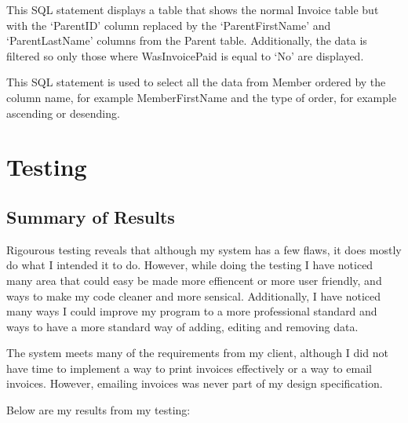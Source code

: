This SQL statement displays a table that shows the normal Invoice table but with the `ParentID' column replaced by the `ParentFirstName' and `ParentLastName' columns from the Parent table. Additionally, the data is filtered so only those where WasInvoicePaid is equal to `No' are displayed.


This SQL statement is used to select all the data from Member ordered by the column name, for example MemberFirstName and the type of order, for example ascending or desending.

\section{Testing}

\subsection{Summary of Results}
Rigourous testing reveals that although my system has a few flaws, it does mostly do what I intended it to do. However, while doing the testing I have noticed many area that could easy be made more effiencent or more user friendly, and ways to make my code cleaner and more sensical. Additionally, I have noticed many ways I could improve my program to a more professional standard and ways to have a more standard way of adding, editing and removing data.

The system meets many of the requirements from my client, although I did not have time to implement a way to print invoices effectively or a way to email invoices. However, emailing invoices was never part of my design specification.

Below are my results from my testing:


